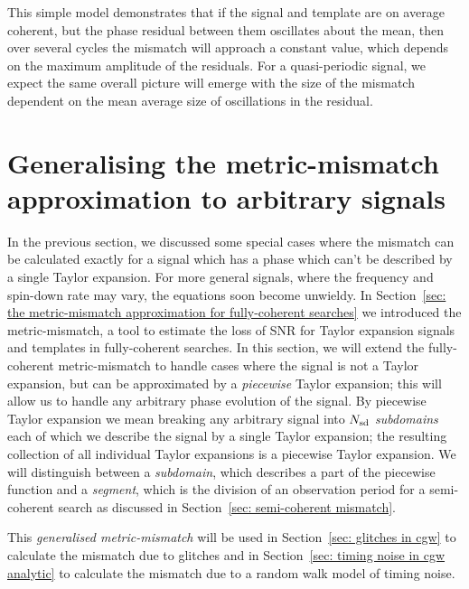 \documentclass[../full_thesis/full_thesis.tex]{subfiles}
\begin{document}
This simple model demonstrates that if the signal and template are on average
coherent, but the phase residual between them oscillates about the mean, then
over several cycles the mismatch will approach a constant value, which depends
on the maximum amplitude of the residuals.  For a quasi-periodic signal, we
expect the same overall picture will emerge with the size of the mismatch
dependent on the mean average size of oscillations in the residual.

\section{Generalising the metric-mismatch approximation to arbitrary signals}
\label{sec: generalising the metric-mismatch}

In the previous section, we discussed some special cases where the mismatch can be
calculated exactly for a signal which has a phase which can't be described by
a single Taylor expansion.
For more general signals, where the frequency and spin-down rate may
vary, the equations soon become unwieldy. In Section~\ref{sec: the
metric-mismatch approximation for fully-coherent searches} we introduced the
metric-mismatch, a tool to estimate the loss of SNR for Taylor expansion
signals and templates in fully-coherent searches. In this section, we will
extend the fully-coherent metric-mismatch to handle cases where the
signal is not a Taylor expansion, but can be approximated by a \emph{piecewise}
Taylor expansion; this will allow us to handle any arbitrary phase evolution of
the signal. By piecewise Taylor expansion we mean breaking any arbitrary signal into
$N_{\textrm{sd}}$ \emph{subdomains} each of which we describe the signal by a single
Taylor expansion; the resulting collection of all individual Taylor expansions
is a piecewise Taylor expansion. We will distinguish between a \emph{subdomain}, which
describes a part of the piecewise function and a \emph{segment}, which is the division
of an observation period for a semi-coherent search as discussed in
Section~\ref{sec: semi-coherent mismatch}. 

This \emph{generalised metric-mismatch} will be used in Section~\ref{sec: glitches
in cgw} to calculate the mismatch due to glitches and in Section~\ref{sec: timing
noise in cgw analytic} to calculate the mismatch due to a random walk model of
timing noise.


\end{document}
